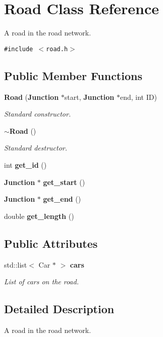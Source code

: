 \section{Road Class Reference}
\label{classRoad}
A road in the road network.  


{\tt \#include $<$road.h$>$}

\subsection*{Public Member Functions}
\begin{CompactItemize}
\item 
{\bf Road} ({\bf Junction} $\ast$start, {\bf Junction} $\ast$end, int ID)
\begin{CompactList}\small\item\em Standard constructor. \item\end{CompactList}\item 
{\bf $\sim$Road} ()
\begin{CompactList}\small\item\em Standard destructor. \item\end{CompactList}\item 
int {\bf get\_\-id} ()
\item 
{\bf Junction} $\ast$ {\bf get\_\-start} ()
\item 
{\bf Junction} $\ast$ {\bf get\_\-end} ()
\item 
double {\bf get\_\-length} ()
\end{CompactItemize}
\subsection*{Public Attributes}
\begin{CompactItemize}
\item 
std::list$<$ Car $\ast$ $>$ {\bf cars}
\begin{CompactList}\small\item\em List of cars on the road. \item\end{CompactList}\end{CompactItemize}


\subsection{Detailed Description}
A road in the road network. 



